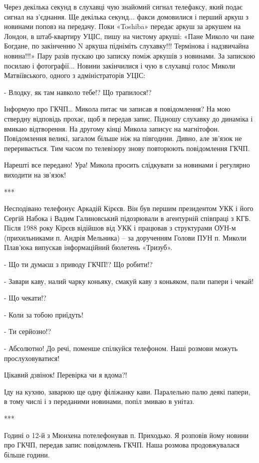 Через декілька секунд в слухавці чую знайомий сигнал телефаксу, який подає
сигнал на з’єднання. Ще декілька секунд... факси домовилися і перший аркуш з
новинами поповз на передачу. Поки «Toshiba» передає аркуш за аркушем на Лондон,
в штаб-квартиру УЦІС, пишу на чистому аркуші: «Пане Миколо чи пане Богдане, по
закінченню N аркуша підніміть слухавку!!! Термінова і надзвичайна новина!!!»
Пару разів пускаю цю записку поміж аркушів з новинами. За запискою посилаю і
фотографії... Новини закінчилися і чую в слухавці голос Миколи Матвіївського,
одного з адміністраторів УЦІС: 

- Влодку, як там навколо тебе!? Що трапилося!?

Інформую про ГКЧП… Микола питає чи записав я повідомлення? На мою ствердну
відповідь прохає, щоб я передав запис. Підношу слухавку до динаміка і вмикаю
відтворення. На другому кінці Микола записує на магнітофон. Повідомлення
великі, загалом більше ніж на півгодини. Дивно, але зв’язок не переривається.
Тим часом по телевізору знову повторюють повідомлення ГКЧП.

Нарешті все передано! Ура! Микола просить слідкувати за новинами і регулярно
виходити на зв’язок!

***

Несподівано телефонує Аркадій Кірєєв. Він був першим президентом УКК і його
Сергій Набока і Вадим Галиновський підозрювали в агентурній співпраці з КГБ.
Після 1988 року Кірєєв відійшов від УКК і працював з структурами ОУН-м
(прихильниками п. Андрія Мельника) – за дорученням Голови ПУН п. Миколи
Плав’юка випускав інформаційний бюлетень «Тризуб». 

- Що ти думаєш з приводу ГКЧП!? Що робити!?

- Завари каву, налий чарку коньяку, смакуй каву з коньяком, пали папери і
чекай!

- Що чекати!?

- Коли за тобою приїдуть!

- Ти серйозно!?

- Абсолютно! До речі, поменше спілкуйся телефоном. Наші розмови можуть
прослуховуватися!

Цікавий дзвінок! Перевірка чи я вдома?!

Іду на кухню, заварюю ще одну філіжанку кави. Паралельно палю деякі папери, в
тому числі і з переданими новинами, попіл змиваю в унітаз.

***

Годині о 12-й з Мюнхена потелефонував п. Приходько. Я розповів йому новини про
ГКЧП, передав запис повідомлень ГКЧП. Наша розмова продовжувалася більше
години. 

